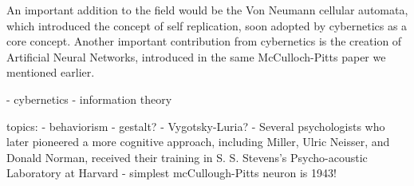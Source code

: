 \documentclass[../main.tex]{subfiles}
\begin{document}
An important addition to the field would be the Von Neumann cellular automata, which introduced the concept of self replication, soon adopted by cybernetics as a core concept. Another important contribution from cybernetics is the creation of Artificial Neural Networks, introduced in the same McCulloch-Pitts paper we mentioned earlier.

- cybernetics
- information theory

topics:
- behaviorism
- gestalt?
- Vygotsky-Luria?
- Several psychologists who later pioneered a more cognitive approach, including Miller, Ulric Neisser, and Donald Norman, received their training in S. S. Stevens’s Psycho-acoustic Laboratory at Harvard
- simplest mcCullough-Pitts neuron is 1943!
\end{document}
